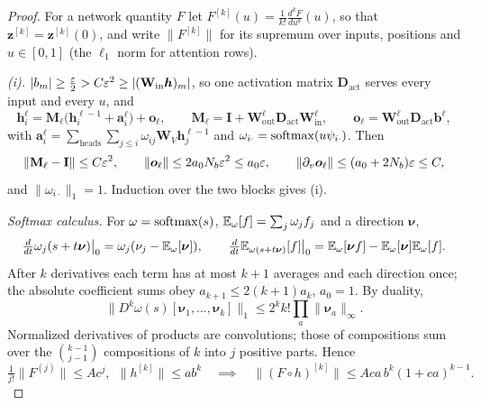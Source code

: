 \begin{proof}
For a network quantity $F$ let $F^{[k]}(u)=\frac{1}{k!}\frac{d^kF}{du^k}(u)$, so that $\bm z^{[k]}=\bm z^{[k]}(0)$, and write $\|F^{[k]}\|$ for its supremum over
inputs, positions and $u\in[0,1]$ (the $\ell_1$ norm for attention rows).

\emph{(i).} $|b_m|\ge\frac{\varepsilon}{2}>C\varepsilon^2\ge|(\mathbf W_{\mathrm{in}}\bm h)_m|$, so one activation matrix $\mathbf D_{\mathrm{act}}$ serves every input and every $u$, and
\[
 \bm h_i^\ell=\mathbf M_\ell\bigl(\bm h_i^{\ell-1}+\bm a_i^\ell\bigr)+\bm o_\ell,\qquad \mathbf M_\ell=\mathbf I+\mathbf W^\ell_{\mathrm{out}}\mathbf D_{\mathrm{act}}\mathbf W^\ell_{\mathrm{in}},\qquad \bm o_\ell=\mathbf W^\ell_{\mathrm{out}}\mathbf D_{\mathrm{act}}\bm b^\ell,
\]
with $\bm a_i^\ell=\sum_{\mathrm{heads}}\sum_{j\le i}\omega_{ij}\mathbf W_V\bm h^{\ell-1}_j$ and $\omega_{i\cdot}=\operatorname{softmax}(u\psi_{i\cdot})$. Then
\[
 \|\mathbf M_\ell-\mathbf I\|\le C\varepsilon^2,\qquad \|\bm o_\ell\|\le2a_0N_b\varepsilon^2\le a_0\varepsilon,\qquad \|\partial_v\bm o_\ell\|\le(a_0+2N_b)\varepsilon\le C,
\]
and $\|\omega_{i\cdot}\|_1=1$. Induction over the two blocks gives (i).

\emph{Softmax calculus.} For $\omega=\operatorname{softmax}(s)$, $\mathbb E_\omega[f]=\sum_j\omega_jf_j$ and a direction $\bm\nu$,
\[
 \tfrac{d}{dt}\omega_j(s+t\bm\nu)\big|_0=\omega_j(\nu_j-\mathbb E_\omega[\bm\nu]),\qquad
 \tfrac{d}{dt}\mathbb E_{\omega(s+t\bm\nu)}[f]\big|_0=\mathbb E_\omega[\bm\nu f]-\mathbb E_\omega[\bm\nu]\mathbb E_\omega[f].
\]
After $k$ derivatives each term has at most $k+1$ averages and each direction once; the absolute coefficient sums obey $a_{k+1}\le2(k+1)a_k$,
$a_0=1$. By duality,
\begin{equation}
 \bigl\|D^k\omega(s)[\bm\nu_1,\ldots,\bm\nu_k]\bigr\|_1\le2^kk!\prod_a\|\bm\nu_a\|_\infty .
 \label{eq:softmax-avg}
\end{equation}
Normalized derivatives of products are convolutions; those of compositions sum over the $\binom{k-1}{j-1}$ compositions of $k$ into $j$
positive parts. Hence
\[
 \tfrac{1}{j!}\|F^{(j)}\|\le Ac^j,\ \ \|h^{[k]}\|\le ab^k\quad\implies\quad\|(F\circ h)^{[k]}\|\le Aca\,b^k(1+ca)^{k-1}.
\]


\end{proof}
